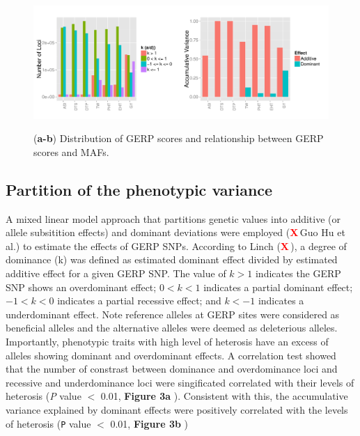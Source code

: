 \documentclass[twoside,twocolumn, letterpaper]{article}
\renewcommand{\baselinestretch}{1}
\newcommand{\X}{\textcolor{red}{\bf X\,}}
\begin{document}
\begin{figure}[tbh]   
  \begin{center}
   \vspace{-2mm}
   \includegraphics[width=0.8\linewidth]{Fig3_eff_var.pdf}
   \renewcommand{\baselinestretch}{0.9}
   \vspace{-3mm}
   \caption{({\bfseries a-b}) Distribution of GERP scores and relationship between GERP scores and MAFs. } 
\vspace{-4mm}
    \label{fig:effvar}
  \end{center}
\end{figure}

\subsection*{Partition of the phenotypic variance}

A mixed linear model approach that partitions genetic values into additive (or allele subsitition effects) and dominant deviations were employed (\X Guo Hu et al.) to estimate the effects of GERP SNPs. According to Linch (\X), a degree of dominance (k) was defined as estimated dominant effect divided by estimated additive effect for a given GERP SNP. The value of $k > 1$ indicates the GERP SNP shows an overdominant effect; $0 < k < 1$ indicates a partial dominant effect; $-1 < k < 0$ indicates a partial recessive effect; and $k < -1$ indicates a underdominant effect. Note reference alleles at GERP sites were considered as beneficial alleles and the alternative alleles were deemed as deleterious alleles. Importantly, phenotypic traits with high level of heterosis have an excess of alleles showing dominant and overdominant effects. A correlation test showed that the number of constrast between dominance and overdominance loci and recessive and underdominance loci were singificated correlated with their levels of heterosis (\emph{P} value $<$ 0.01, \textbf{Figure 3a} ). Consistent with this, the accumulative variance explained by dominant effects were positively correlated with the levels of heterosis (\texttt{P} value $<$ 0.01,  \textbf{Figure 3b} )
\end{document}
